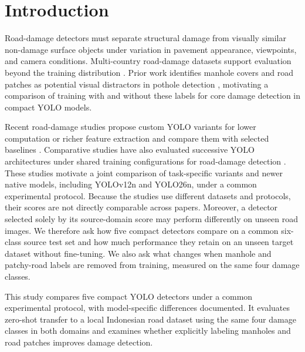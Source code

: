 \documentclass[conference]{IEEEtran}
\newif\ifdistractoranalysis \distractoranalysistrue %
\begin{document}
\section{Introduction}
Road-damage detectors must separate structural damage from visually similar non-damage surface objects under variation in pavement appearance, viewpoints, and camera conditions. Multi-country road-damage datasets support evaluation beyond the training distribution \cite{arya2021deep,Arya2024846}. Prior work identifies manhole covers and road patches as potential visual distractors in pothole detection \cite{matouq2024ai,bucko2022computer,Shi_2026}, motivating a comparison of training with and without these labels for core damage detection in compact YOLO models.

Recent road-damage studies propose custom YOLO variants for lower computation or richer feature extraction and compare them with selected baselines \cite{Li2024,Zeng2024,Wang2025}. Comparative studies have also evaluated successive YOLO architectures under shared training configurations for road-damage detection \cite{tilmisani2025road}. These studies motivate a joint comparison of task-specific variants and newer native models, including YOLOv12n and YOLO26n, under a common experimental protocol. Because the studies use different datasets and protocols, their scores are not directly comparable across papers. Moreover, a detector selected solely by its source-domain score may perform differently on unseen road images. We therefore ask how five compact detectors compare on a common six-class source test set and how much performance they retain on an unseen target dataset without fine-tuning.
\ifdistractoranalysis We also ask what changes when manhole and patchy-road labels are removed from training, measured on the same four damage classes.\fi

This study compares five compact YOLO detectors under a common experimental protocol, with model-specific differences documented. It evaluates zero-shot transfer to a local Indonesian road dataset using the same four damage classes in both domains\ifdistractoranalysis{} and examines whether explicitly labeling manholes and road patches improves damage detection\fi{}.
\end{document}
